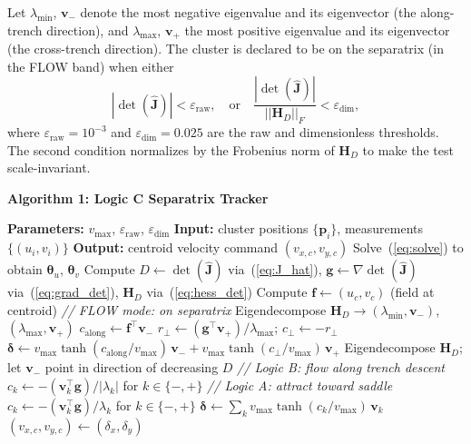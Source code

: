 \documentclass[lettersize,journal]{IEEEtran}
\begin{document}
Let $\lambda_{\min}$, $\mathbf{v}_-$ denote the most negative eigenvalue and
its eigenvector (the along-trench direction), and $\lambda_{\max}$,
$\mathbf{v}_+$ the most positive eigenvalue and its eigenvector (the
cross-trench direction). The cluster is declared to be on the separatrix
(in the FLOW band) when either
\begin{equation}
    |\det(\hat{\mathbf{J}})| < \varepsilon_{\text{raw}}, \quad
    \text{or} \quad
    \frac{|\det(\hat{\mathbf{J}})|}{||\mathbf{H}_D||_F} < \varepsilon_{\text{dim}},
    \label{eq:flow_band}
\end{equation}
where $\varepsilon_{\text{raw}} = 10^{-3}$ and $\varepsilon_{\text{dim}} =
0.025$ are the raw and dimensionless thresholds. The second condition normalizes
by the Frobenius norm of $\mathbf{H}_D$ to make the test scale-invariant.

\vspace{4pt}
\noindent\textbf{Algorithm 1: Logic C Separatrix Tracker}
\begin{algorithmic}[1]
    \STATE \textbf{Parameters:} $v_{\max}$, $\varepsilon_{\text{raw}}$,
           $\varepsilon_{\text{dim}}$
    \STATE \textbf{Input:} cluster positions $\{\mathbf{p}_i\}$,
           measurements $\{(u_i, v_i)\}$
    \STATE \textbf{Output:} centroid velocity command $(v_{x,c}, v_{y,c})$
    \STATE Solve~(\ref{eq:solve}) to obtain $\boldsymbol{\theta}_u$,
           $\boldsymbol{\theta}_v$
    \STATE Compute $D \leftarrow \det(\hat{\mathbf{J}})$ via~(\ref{eq:J_hat}),
           $\mathbf{g} \leftarrow \nabla\det(\hat{\mathbf{J}})$
           via~(\ref{eq:grad_det}),
           $\mathbf{H}_D$ via~(\ref{eq:hess_det})
    \STATE Compute $\mathbf{f} \leftarrow (u_c, v_c)$ (field at centroid)
        \STATE \textit{// FLOW mode: on separatrix}
        \STATE Eigendecompose $\mathbf{H}_D \to (\lambda_{\min}, \mathbf{v}_-)$,
               $(\lambda_{\max}, \mathbf{v}_+)$
        \STATE $c_{\text{along}} \leftarrow \mathbf{f}^\top \mathbf{v}_-$
        \STATE $r_{\perp} \leftarrow (\mathbf{g}^\top \mathbf{v}_+) /
               \lambda_{\max}$; \; $c_{\perp} \leftarrow -r_{\perp}$
        \STATE $\boldsymbol{\delta} \leftarrow v_{\max}\tanh(c_{\text{along}} /
               v_{\max})\,\mathbf{v}_- + v_{\max}\tanh(c_{\perp} /
               v_{\max})\,\mathbf{v}_+$
    \ELSE
        \STATE Eigendecompose $\mathbf{H}_D$; let $\mathbf{v}_-$ point in
               direction of decreasing $D$
            \STATE \textit{// Logic B: flow along trench descent}
            \STATE $c_k \leftarrow -(\mathbf{v}_k^\top \mathbf{g}) /
                   |\lambda_k|$ for $k \in \{-, +\}$
        \ELSE
            \STATE \textit{// Logic A: attract toward saddle}
            \STATE $c_k \leftarrow -(\mathbf{v}_k^\top \mathbf{g}) /
                   \lambda_k$ for $k \in \{-, +\}$
        \ENDIF
        \STATE $\boldsymbol{\delta} \leftarrow
               \sum_{k} v_{\max}\tanh(c_k / v_{\max})\,\mathbf{v}_k$
    \ENDIF
    \RETURN $(v_{x,c}, v_{y,c}) \leftarrow (\delta_x, \delta_y)$
\end{algorithmic}
\end{document}
